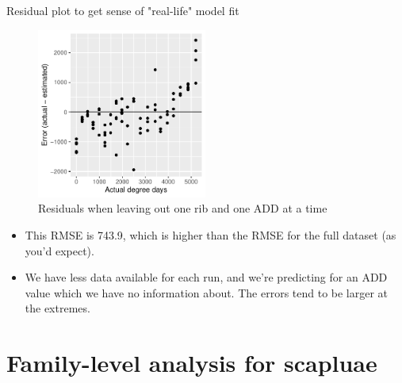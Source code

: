 \documentclass{beamer}
\begin{document}
\begin{frame}{Residual plot to get sense of "real-life" model fit}

  \begin{center}
    \begin{figure}
      \includegraphics[width=2.2in]{use_families/w_ribs/leave_out_one_rib_and_one_day_residuals}
      \caption{Residuals when leaving out one rib and one ADD at a time}
    \end{figure}
  \end{center}
  \vspace{-0.1in}
{\scriptsize
\begin{itemize}
  \item This RMSE is 743.9, which is higher than the RMSE for the full
  dataset (as you'd expect).
  \item We have less data available for each run, and we're predicting for an
  ADD value which we have no information about.  The errors tend to be larger at
  the extremes.
\end{itemize}
}

\end{frame}



\section[Scapulae, family-level]{Family-level analysis for scapluae}
\end{document}

